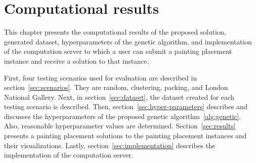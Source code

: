 \chapter{Computational results}\label{ch:computational-results}

This chapter presents the computational results of the proposed solution,
generated dataset, hyperparameters of the genetic algorithm,
and implementation of the computation server
to which a user can submit a painting placement instance and receive a solution to that instance.

First, four testing scenarios used for evaluation are described in
section~\ref{sec:scenarios}.
They are random, clustering, packing, and London National Gallery.
Next, in section~\ref{sec:dataset}, the dataset created for each testing scenario is described.
Then, section~\ref{sec:hyper-parameters} describes and discusses
the hyperparameters of the proposed genetic algorithm~\ref{alg:genetic}.
Also, reasonable hyperparameter values are determined.
Section~\ref{sec:results} presents a painting placement solutions to the painting placement instances and their visualizations.
Lastly, section~\ref{sec:implementation} describes the implementation of the computation server.






